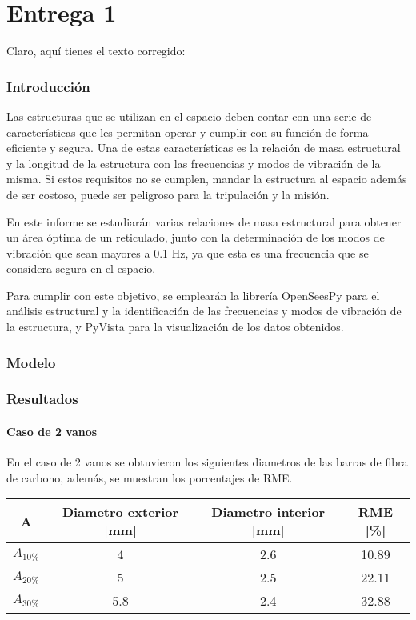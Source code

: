 \part{Entrega 1}
Claro, aquí tienes el texto corregido:

\section{Introducción}
Las estructuras que se utilizan en el espacio deben contar con una serie de características que les permitan operar y cumplir con su función de forma eficiente y segura. Una de estas características es la relación de masa estructural y la longitud de la estructura con las frecuencias y modos de vibración de la misma. Si estos requisitos no se cumplen, mandar la estructura al espacio además de ser costoso, puede ser peligroso para la tripulación y la misión.

En este informe se estudiarán varias relaciones de masa estructural para obtener un área óptima de un reticulado, junto con la determinación de los modos de vibración que sean mayores a 0.1 Hz, ya que esta es una frecuencia que se considera segura en el espacio.

Para cumplir con este objetivo, se emplearán la librería OpenSeesPy para el análisis estructural y la identificación de las frecuencias y modos de vibración de la estructura, y PyVista para la visualización de los datos obtenidos.
\newpage
\section{Modelo}


\section{Resultados}

\subsection{Caso de 2 vanos}
En el caso de 2 vanos se obtuvieron los siguientes diametros de las barras de fibra de carbono, además, se muestran los porcentajes de RME.

\begin{table}[H]
    \centering
    \begin{tabular}{cccc}
    \toprule
     A & Diametro exterior [mm] & Diametro interior [mm] & RME [\%] \\
    \midrule
     $A_{10\%}$ &  4 &  2.6 &  10.89 \\
     $A_{20\%}$ &  5 &  2.5 &  22.11 \\
     $A_{30\%}$ &  5.8 &  2.4 &  32.88 \\
    \bottomrule
    \end{tabular}
\end{table}


